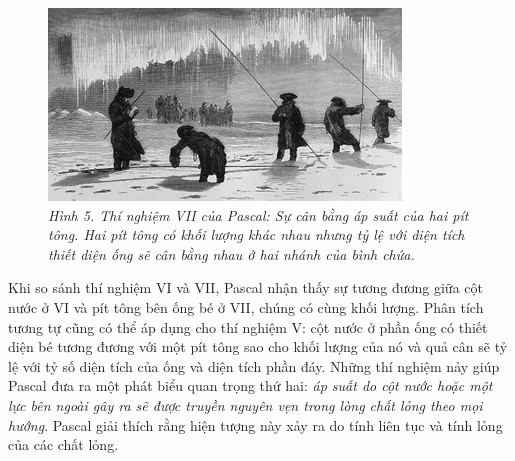 \begin{multicols}{2}
\begin{figure}[H]
		\includegraphics[width= 1\linewidth]{6}
		\caption{\small\textit{\color{timhieukhoahoc}Hình 5. Thí nghiệm VII của Pascal: Sự cân bằng áp suất của hai pít tông. Hai pít tông có khối lượng khác nhau nhưng tỷ lệ với diện tích thiết diện ống sẽ cân bằng nhau ở hai nhánh của bình chứa.}}
		\vspace*{-10pt}
	\end{figure}
	Khi so sánh thí nghiệm VI và VII, Pascal nhận thấy sự tương đương giữa cột nước ở VI và pít tông bên ống bé ở VII, chúng có cùng khối lượng. Phân tích tương tự cũng có thể áp dụng cho thí nghiệm V: cột nước ở phần ống có thiết diện bé tương đương với một pít tông sao cho khối lượng của nó và quả cân sẽ tỷ lệ với tỷ số diện tích của ống và diện tích phần đáy.
	\vskip 0.1cm
	Những thí nghiệm nảy giúp Pascal đưa ra một phát biểu quan trọng thứ hai: \textit{áp suất do cột nước hoặc một lực bên ngoài gây ra sẽ được truyền nguyên vẹn trong lòng chất lỏng theo mọi hướng}. Pascal giải thích rằng hiện tượng này xảy ra do tính liên tục và tính lỏng của các chất lỏng.
	\vskip 0.2cm

\end{multicols}
